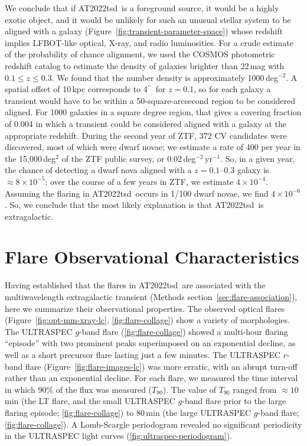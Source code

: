 \documentclass{nature_plusfigure}
\newcommand{\at}{AT2022tsd}
\newcommand{\arcsec}{$^{\prime\prime}$}
\begin{document}
\begin{methods}
We conclude that if \at\ is a foreground source, it would be a highly exotic object, and it would be unlikely for such an unusual stellar system to be aligned with a galaxy (Figure~\ref{fig:transient-parameter-space}) whose redshift implies LFBOT-like optical, X-ray, and radio luminosities.
For a crude estimate of the probability of chance alignment, we used the COSMOS photometric redshift catalog\cite{Ilbert2008} to estimate the density of galaxies brighter than 22\,mag with $0.1 \leq z \leq 0.3$. We found that the number density is approximately 1000\,deg$^{-2}$.
A spatial offset of 10\,kpc corresponds to 4\arcsec\ for $z=0.1$, so for each galaxy a transient would have to be within a 50-square-arcsecond region to be considered aligned. For 1000 galaxies in a square degree region, that gives a covering fraction of 0.004 in which a transient could be considered aligned with a galaxy at the appropriate redshift.
During the second year of ZTF, 372 CV candidates were discovered\cite{Szkody2021}, most of which were dwarf novae; we estimate a rate of 400 per year in the 15,000\,deg$^{2}$ of the ZTF public survey, or 0.02\,deg$^{-2}$\,yr$^{-1}$. So, in a given year, the chance of detecting a dwarf nova aligned with a $z=0.1$--0.3 galaxy is $\approx 8\times10^{-5}$; over the course of a few years in ZTF, we estimate $4\times10^{-4}$. Assuming the flaring in \at\ occurs in 1/100 dwarf novae, we find $4\times10^{-6}$.
So, we conclude that the most likely explanation is that \at\ is extragalactic.

\section{Flare Observational Characteristics}
\label{sec:flare-characteristics}

Having established that the flares in \at\ are associated with the multiwavelength extragalactic transient (Methods section~\ref{sec:flare-association}), here we summarize their observational properties.
The observed optical flares (Figure~\ref{fig:opt-mm-xray-lc}, \ref{fig:flare-collage}) show a variety of morphologies. The ULTRASPEC $g$-band flare (\ref{fig:flare-collage}) showed a multi-hour flaring ``episode'' with two prominent peaks superimposed on an exponential decline, as well as a short precursor flare lasting just a few minutes. The ULTRASPEC $r$-band flare (Figure~\ref{fig:flare-images-lc}) was more erratic, with an abrupt turn-off rather than an exponential decline. For each flare, we measured the time interval in which 90\% of the flux was measured ($T_{90}$). The value of $T_{90}$ ranged from $\approx10$\,min (the LT flare, and the small ULTRASPEC $g$-band flare prior to the large flaring episode; \ref{fig:flare-collage}) to 80\,min (the large ULTRASPEC $g$-band flare; \ref{fig:flare-collage}). A Lomb-Scargle periodogram\cite{Lomb1976,Scargle1982} revealed no significant periodicity in the ULTRASPEC light curves (\ref{fig:ultraspec-periodogram}).


\end{methods}
\end{document}
